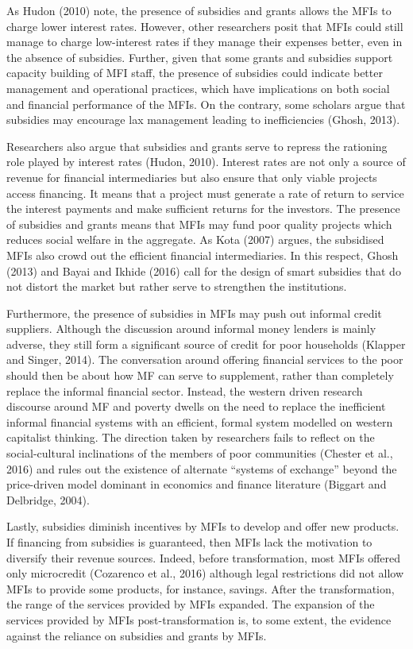 \documentclass[a4paper, nobind]{templates/ociamthesis}
\begin{document}
As Hudon (2010) note, the presence of subsidies and grants allows the MFIs to charge lower interest rates. However, other researchers posit that MFIs could still manage to charge low-interest rates if they manage their expenses better, even in the absence of subsidies. Further, given that some grants and subsidies support capacity building of MFI staff, the presence of subsidies could indicate better management and operational practices, which have implications on both social and financial performance of the MFIs. On the contrary, some scholars argue that subsidies may encourage lax management leading to inefficiencies (Ghosh, 2013).

Researchers also argue that subsidies and grants serve to repress the rationing role played by interest rates (Hudon, 2010). Interest rates are not only a source of revenue for financial intermediaries but also ensure that only viable projects access financing. It means that a project must generate a rate of return to service the interest payments and make sufficient returns for the investors. The presence of subsidies and grants means that MFIs may fund poor quality projects which reduces social welfare in the aggregate. As Kota (2007) argues, the subsidised MFIs also crowd out the efficient financial intermediaries. In this respect, Ghosh (2013) and Bayai and Ikhide (2016) call for the design of smart subsidies that do not distort the market but rather serve to strengthen the institutions.

Furthermore, the presence of subsidies in MFIs may push out informal credit suppliers. Although the discussion around informal money lenders is mainly adverse, they still form a significant source of credit for poor households (Klapper and Singer, 2014). The conversation around offering financial services to the poor should then be about how MF can serve to supplement, rather than completely replace the informal financial sector. Instead, the western driven research discourse around MF and poverty dwells on the need to replace the inefficient informal financial systems with an efficient, formal system modelled on western capitalist thinking. The direction taken by researchers fails to reflect on the social-cultural inclinations of the members of poor communities (Chester et al., 2016) and rules out the existence of alternate ``systems of exchange'' beyond the price-driven model dominant in economics and finance literature (Biggart and Delbridge, 2004).

Lastly, subsidies diminish incentives by MFIs to develop and offer new products. If financing from subsidies is guaranteed, then MFIs lack the motivation to diversify their revenue sources. Indeed, before transformation, most MFIs offered only microcredit (Cozarenco et al., 2016) although legal restrictions did not allow MFIs to provide some products, for instance, savings. After the transformation, the range of the services provided by MFIs expanded. The expansion of the services provided by MFIs post-transformation is, to some extent, the evidence against the reliance on subsidies and grants by MFIs.
\end{document}
